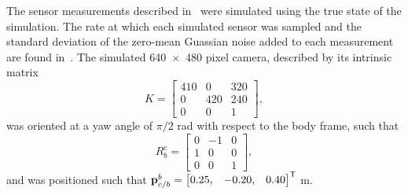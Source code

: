 The sensor measurements described in~ were
simulated using the true state of the simulation. The rate at which each
simulated sensor was sampled and the standard deviation of the zero-mean
Guassian noise added to each measurement are found
in~.
The 
simulated 640~$\times$~480 pixel camera, described by its intrinsic matrix
\begin{equation}
  K =
  \begin{bmatrix}
    410 & 0 & 320 \\
    0 & 420 & 240 \\
    0& 0 & 1
  \end{bmatrix},
\end{equation}
was oriented at a yaw angle of $\pi/2$ rad with respect to the body
frame, such that
\begin{equation}
  R_b^c =
  \begin{bmatrix}
    0 & -1 & 0 \\
    1 & 0 & 0 \\
    0 & 0 & 1
  \end{bmatrix},
\end{equation}
and was positioned such that $\mathrm{\mathbf{p}}_{c/b}^b = \begin{bmatrix}0.25, & -0.20, &
0.40 \end{bmatrix}^{\mathsf{T}}$ m.

